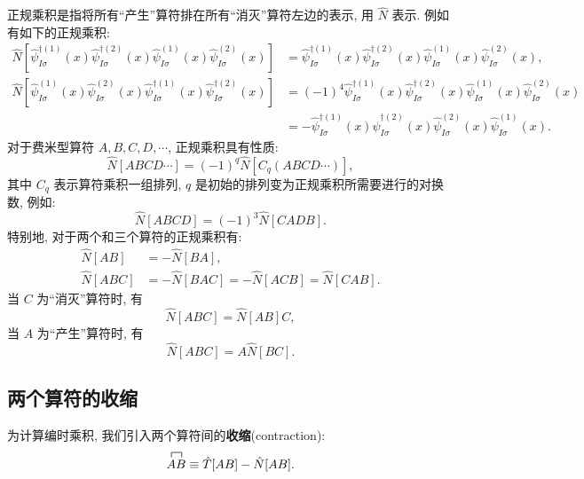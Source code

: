 正规乘积是指将所有“产生”算符排在所有“消灭”算符左边的表示, 用 $\hat N$ 表示. 例如有如下的正规乘积:
\begin{align}
\hat{N}\left[\hat{\psi}_{I \sigma}^{\dagger(1)}(x) \hat{\psi}_{I \sigma}^{\dagger(2)}(x) \hat{\psi}_{I \sigma}^{(1)}(x) \hat{\psi}_{I \sigma}^{(2)}(x)\right]&=\hat{\psi}_{I \sigma}^{\dagger(1)}(x) \hat{\psi}_{I \sigma}^{\dagger(2)}(x) \hat{\psi}_{I \sigma}^{(1)}(x) \hat{\psi}_{I \sigma}^{(2)}(x), \\
\hat{N}\left[\hat{\psi}_{I \sigma}^{(1)}(x) \hat{\psi}_{I \sigma}^{(2)}(x) \hat{\psi}_{I \sigma}^{\dagger(1)}(x) \hat{\psi}_{I \sigma}^{\dagger(2)}(x)\right]&=(-1)^4\hat{\psi}_{I \sigma}^{\dagger(1)}(x) \hat{\psi}_{I \sigma}^{\dagger(2)}(x) \hat{\psi}_{I \sigma}^{(1)}(x) \hat{\psi}_{I \sigma}^{(2)}(x)\nonumber\\
&=-\hat{\psi}_{I \sigma}^{\dagger(1)}(x) \hat{\psi}_{I \sigma}^{\dagger(2)}(x) \hat{\psi}_{I \sigma}^{(2)}(x) \hat{\psi}_{I \sigma}^{(1)}(x).
\end{align}
对于费米型算符 $A, B, C, D, \cdots$, 正规乘积具有性质:
\begin{equation}\label{zgcjxz}
\hat{N}[A B C D \cdots]=(-1)^{q} \hat{N}\left[C_{q}(A B C D \cdots)\right],
\end{equation}
其中 $C_{q}$ 表示算符乘积一组排列, $q$ 是初始的排列变为正规乘积所需要进行的对换数, 例如:
\begin{equation}
\hat{N}[A B C D]=(-1)^{3} \hat{N}[C A D B].
\end{equation}
特别地, 对于两个和三个算符的正规乘积有:
\begin{align}
\hat{N}[A B]&=-\hat{N}[B A] ,\\
\hat{N}[A B C]&=-\hat{N}[B A C]=-\hat{N}[A C B]=\hat{N}[C A B].
\end{align}
当 $C$ 为“消灭”算符时, 有
\begin{equation}\label{xmsf}
\hat{N}[A B C]=\hat{N}[A B]C,
\end{equation}
当 $A$ 为“产生”算符时, 有
\begin{equation}\label{cssf}
\hat{N}[A B C]=A\hat{N}[B C].
\end{equation}

\subsection{两个算符的收缩}
为计算编时乘积, 我们引入两个算符间的\textbf{收缩}(contraction):
\begin{equation}
\contraction[1ex]{}{A}{}{B}AB\equiv\hat{T}[A B]-\hat{N}[A B].
\end{equation}


